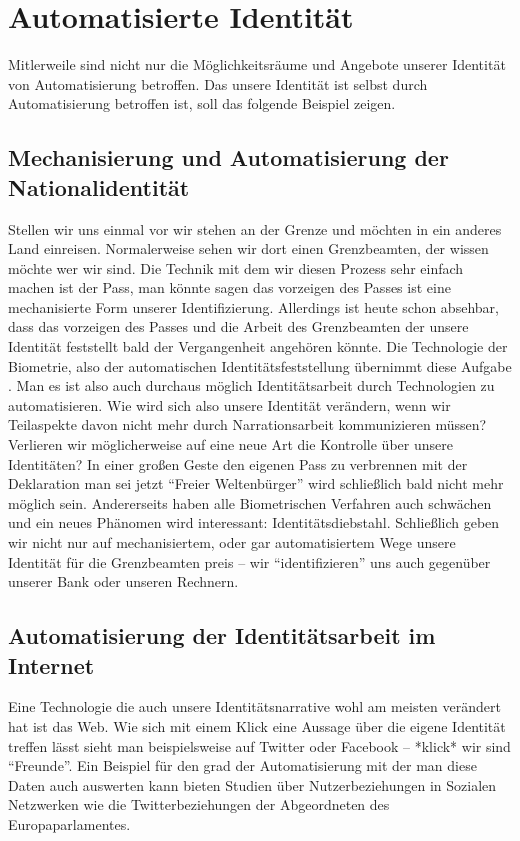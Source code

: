 \section {Automatisierte Identität}

Mitlerweile sind nicht nur die Möglichkeitsräume und Angebote unserer Identität von Automatisierung betroffen.
Das unsere Identität ist selbst durch Automatisierung betroffen ist, soll das folgende Beispiel zeigen.

\subsection {Mechanisierung und Automatisierung der Nationalidentität}

Stellen wir uns einmal vor wir stehen an der Grenze und möchten in ein anderes Land einreisen.
Normalerweise sehen wir dort einen Grenzbeamten, der wissen möchte wer wir sind.
Die Technik mit dem wir diesen Prozess sehr einfach machen ist der Pass, man könnte sagen das vorzeigen des Passes ist eine mechanisierte Form unserer Identifizierung.
Allerdings ist heute schon absehbar, dass das vorzeigen des Passes und die Arbeit des Grenzbeamten der unsere Identität feststellt bald der Vergangenheit angehören könnte.
Die Technologie der Biometrie, also der automatischen Identitätsfeststellung übernimmt diese Aufgabe \parencite{knaut}.
Man es ist also auch durchaus möglich Identitätsarbeit durch Technologien zu automatisieren.
Wie wird sich also unsere Identität verändern, wenn wir Teilaspekte davon nicht mehr durch Narrationsarbeit kommunizieren müssen?
Verlieren wir möglicherweise auf eine neue Art die Kontrolle über unsere Identitäten?
In einer großen Geste den eigenen Pass zu verbrennen mit der Deklaration man sei jetzt \enquote{Freier Weltenbürger} wird schließlich bald nicht mehr möglich sein.
Andererseits haben alle Biometrischen Verfahren auch schwächen und ein neues Phänomen wird interessant: Identitätsdiebstahl. 
Schließlich geben wir nicht nur auf mechanisiertem, oder gar automatisiertem Wege unsere Identität für die Grenzbeamten preis – wir \enquote{identifizieren} uns auch gegenüber unserer Bank oder unseren Rechnern.

\subsection {Automatisierung der Identitätsarbeit im Internet}

Eine Technologie die auch unsere Identitätsnarrative wohl am meisten verändert hat ist das Web.
Wie sich mit einem Klick eine Aussage über die eigene Identität treffen lässt sieht man beispielsweise auf Twitter oder Facebook – *klick* wir sind \enquote{Freunde}.
Ein Beispiel für den grad der Automatisierung mit der man diese Daten auch auswerten kann bieten Studien über Nutzerbeziehungen in Sozialen Netzwerken wie die Twitterbeziehungen der Abgeordneten des Europaparlamentes\parencite{maireder}.

